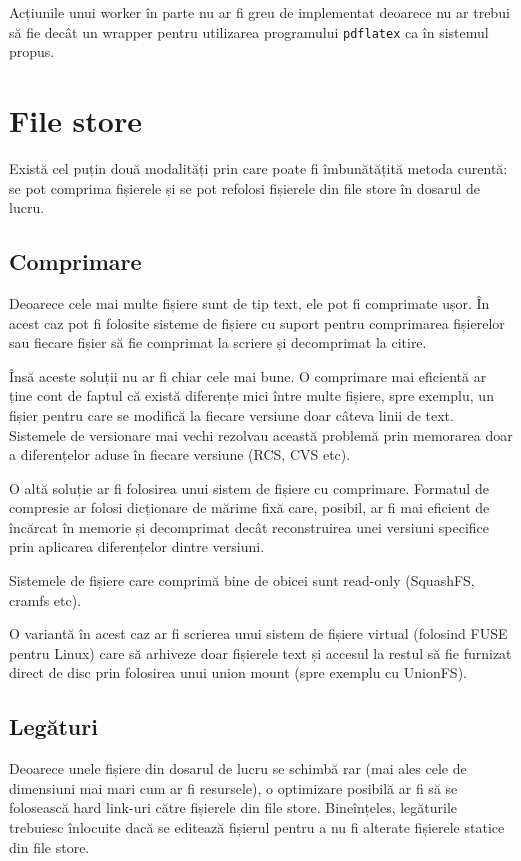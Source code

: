 \documentclass[a4wide,12pt]{report}
\newcommand{\eng}[1]{{#1}} %
\newcommand{\cod}[1]{\texttt{#1}}
\begin{document}
Acțiunile unui worker în parte nu ar fi greu de implementat deoarece nu ar trebui
să fie decât un \eng{wrapper} pentru utilizarea programului \cod{pdflatex} ca
în sistemul propus.

\section{\eng{File store}}
\label{filestoresec}

Există cel puțin două modalități prin care poate fi îmbunătățită metoda curentă:
se pot comprima fișierele și se pot refolosi fișierele din \eng{file store} în
dosarul de lucru.

\subsection{Comprimare}

Deoarece cele mai multe fișiere sunt de tip text, ele pot fi comprimate ușor.
În acest caz pot fi folosite sisteme de fișiere cu suport pentru comprimarea
fișierelor sau fiecare fișier să fie comprimat la scriere și decomprimat la
citire.

Însă aceste soluții nu ar fi chiar cele mai bune. O comprimare mai eficientă
ar ține cont de faptul că există diferențe mici între multe fișiere, spre
exemplu, un fișier pentru care se modifică la fiecare versiune doar câteva linii
de text. Sistemele de versionare mai vechi rezolvau această problemă prin memorarea
doar a diferențelor aduse în fiecare versiune (RCS\cite{rcs}, CVS etc).

O altă soluție ar fi folosirea unui sistem de fișiere cu comprimare. Formatul
de compresie ar folosi dicționare de mărime fixă care, posibil, ar fi mai
eficient de încărcat în memorie și decomprimat decât reconstruirea unei versiuni
specifice prin aplicarea diferențelor dintre versiuni.

Sistemele de fișiere care comprimă bine de obicei sunt read-only (SquashFS,
cramfs etc).

O variantă în acest caz ar fi scrierea unui sistem de fișiere virtual (folosind
FUSE pentru Linux) care să arhiveze doar fișierele text și accesul la restul să
fie furnizat direct de disc prin folosirea unui union mount (spre exemplu cu
UnionFS).

\subsection{Legături}

Deoarece unele fișiere din dosarul de lucru se schimbă rar (mai ales cele
de dimensiuni mai mari cum ar fi resursele), o optimizare posibilă ar fi să se
folosească hard link-uri către fișierele din \eng{file store}. Bineînțeles,
legăturile trebuiesc înlocuite dacă se editează fișierul pentru a nu fi alterate
fișierele statice din \eng{file store}.
\end{document}
